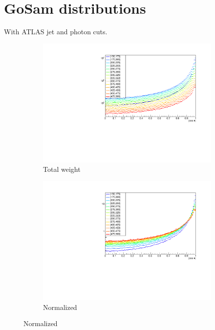 \documentclass[12pt]{article}
\begin{document}
\pagebreak

\section{GoSam distributions}
With ATLAS jet and photon cuts.

\begin{figure}[H]
  \centering
  \begin{subfigure}[b]{0.8\textwidth}
    \centering
    \caption{Total weight}
    \includegraphics[width=\textwidth,trim={10mm 0 10mm 13mm},clip]{plots/gosam.pdf}
  \end{subfigure}
  \begin{subfigure}[b]{0.8\textwidth}
    \centering
    \caption{Normalized}
    \includegraphics[width=\textwidth,trim={10mm 0 10mm 13mm},clip]{plots/gosam_norm.pdf}
  \end{subfigure}
\end{figure}
\end{document}
